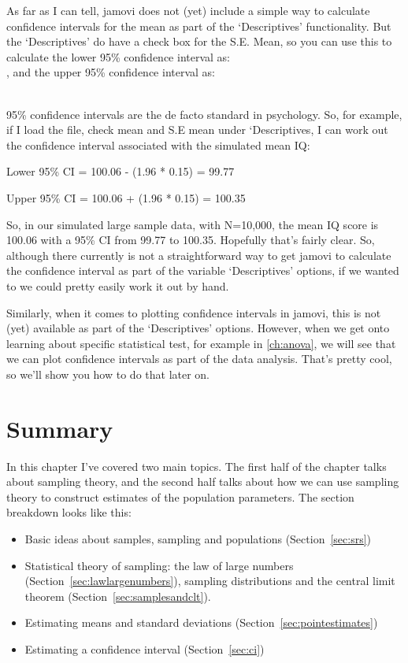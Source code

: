 As far as I can tell, jamovi does not (yet) include a simple way to  calculate confidence intervals for the mean as part of the `Descriptives' functionality. But the `Descriptives' do have a check box for the S.E. Mean, so you can use this to calculate the lower 95\% confidence interval as:\\

 , and the upper 95\% confidence interval as:

 \\

95\% confidence intervals are the de facto standard in psychology. So, for example, if I load the  file, check mean and S.E mean under `Descriptives, I can work out the confidence interval associated with the simulated mean IQ: 

Lower 95\% CI = 100.06 - (1.96 * 0.15) = 99.77

Upper 95\% CI = 100.06 + (1.96 * 0.15) = 100.35 

So, in our simulated large sample data, with N=10,000, the mean IQ score is 100.06 with a 95\% CI from 99.77 to 100.35. Hopefully that's fairly clear. So, although there currently is not a straightforward way to get jamovi to calculate the confidence interval as part of the variable `Descriptives' options, if we wanted to we could pretty easily work it out by hand. 

Similarly, when it comes to plotting confidence intervals in jamovi, this is not (yet) available as part of the `Descriptives' options. However, when we get onto learning about specific statistical test, for example in  \ref{ch:anova}, we will see that we can plot confidence intervals as part of the data analysis. That's pretty cool, so we'll show you how to do that later on.


\section{Summary}

In this chapter I've covered two main topics. The first half of the chapter talks about sampling theory, and the second half talks about how we can use sampling theory to construct estimates of the population parameters. The section breakdown looks like this:

\begin{itemize} \itemsep -2pt
\item Basic ideas about samples, sampling and populations (Section~\ref{sec:srs})
\item Statistical theory of sampling: the law of large numbers (Section~\ref{sec:lawlargenumbers}), sampling distributions and the central limit theorem (Section~\ref{sec:samplesandclt}).
\item Estimating means and standard deviations (Section~\ref{sec:pointestimates})
\item Estimating a confidence interval (Section~\ref{sec:ci})
\end{itemize}

